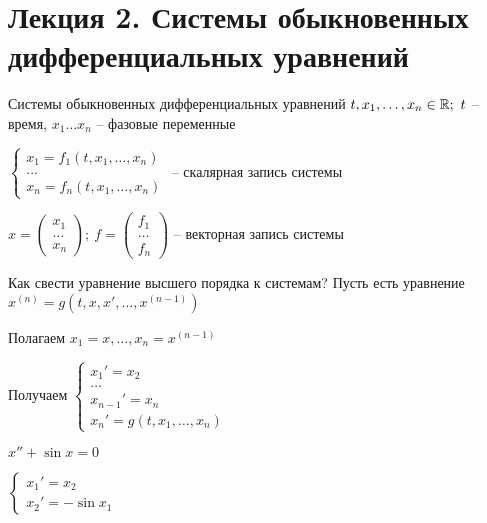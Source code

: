 \documentclass[12pt]{article}
\begin{document}
\newpage

\section{Лекция 2. Системы обыкновенных дифференциальных уравнений}

\begin{defin}{Системы обыкновенных дифференциальных уравнений}
    $t, x_1, \ldots, x_n \in \mathbb R;\ t$ -- время, $x_1 \ldots x_n$ -- фазовые переменные

    $\begin{cases}
        x_1 = f_1(t, x_1, \ldots, x_n) \\
        \ldots \\
        x_n = f_n(t, x_1, \ldots, x_n)
    \end{cases}$ -- скалярная запись системы

    $x = \begin{pmatrix}
        x_1 \\
        \ldots \\
        x_n
    \end{pmatrix};\ f = \begin{pmatrix}
        f_1 \\
        \ldots \\
        f_n
    \end{pmatrix}$ -- векторная запись системы
\end{defin}

\begin{nota}{Как свести уравнение высшего порядка к системам?}
    Пусть есть уравнение $x^{(n)} = g(t, x, x', \ldots, x^{(n-1)})$

    Полагаем $x_1 = x, \ldots, x_n = x^{(n-1)}$

    Получаем $\begin{cases}
        x_1' = x_2 \\
        \ldots \\
        x_{n-1}' = x_n \\
        x_n' = g(t, x_1, \ldots, x_n)
    \end{cases}$
\end{nota}

\begin{Example}{}
    $x'' + \sin x = 0$

    $\begin{cases}
        x_1' = x_2 \\
        x_2' = -\sin x_1
    \end{cases}$
\end{Example}
\end{document}
